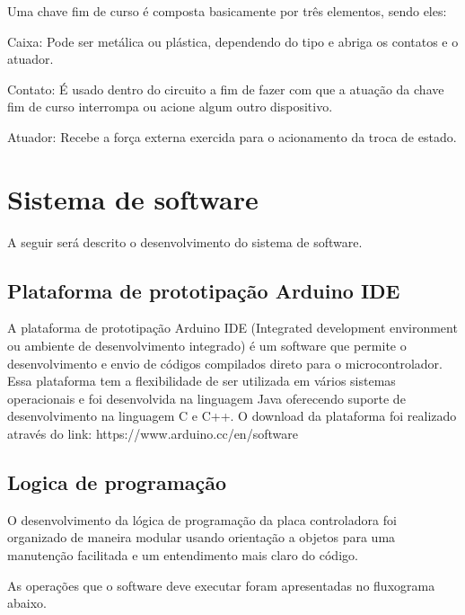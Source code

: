 Uma chave fim de curso é composta basicamente por três elementos, sendo eles:

\begin{alineas}
    \item Caixa: Pode ser metálica ou plástica, dependendo do tipo e abriga os contatos e o atuador.
    \item Contato: É usado dentro do circuito a fim de fazer com que a atuação da chave fim de curso interrompa ou 
    acione algum outro dispositivo.
    \item Atuador: Recebe a força externa exercida para o acionamento da troca de estado.
\end{alineas}

\section{Sistema de software}

A seguir será descrito o desenvolvimento do sistema de software.

\subsection{Plataforma de prototipação Arduino IDE}

A plataforma de prototipação Arduino IDE (Integrated development environment ou ambiente de desenvolvimento integrado) 
é um software que permite o desenvolvimento e envio de códigos compilados direto para o microcontrolador. 
Essa plataforma tem a flexibilidade de ser utilizada em vários sistemas operacionais e foi desenvolvida 
na linguagem Java oferecendo suporte de desenvolvimento na linguagem C e C++. O download da plataforma foi 
realizado através do link: https://www.arduino.cc/en/software


\subsection{Logica de programação}

O desenvolvimento da lógica de programação da placa controladora foi organizado de maneira modular 
usando orientação a objetos para uma manutenção facilitada e um entendimento mais claro do código.

As operações que o software deve executar foram apresentadas no fluxograma abaixo.


